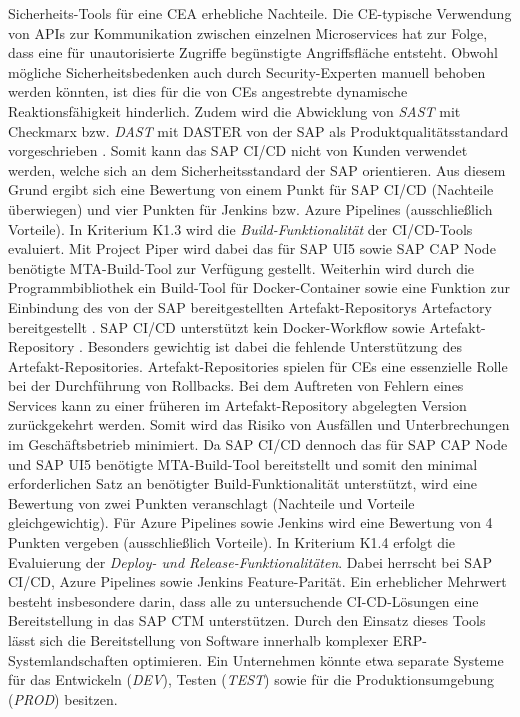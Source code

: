 Sicherheits-Tools für eine CEA erhebliche Nachteile. Die CE-typische Verwendung von APIs zur Kommunikation zwischen einzelnen Microservices hat zur Folge, dass eine für unautorisierte Zugriffe begünstigte Angriffsfläche entsteht. Obwohl mögliche Sicherheitsbedenken auch durch Security-Experten manuell behoben werden könnten, ist dies für die von CEs angestrebte dynamische Reaktionsfähigkeit hinderlich. Zudem wird die Abwicklung von \textit{\ac{SAST}} mit Checkmarx bzw. \textit{\ac{DAST}} mit DASTER von der SAP als Produktqualitätsstandard vorgeschrieben \cite[Z. 37 ff.]{ProductManagerSAPHyperspaceSecurityTools.}. Somit kann das SAP CI/CD nicht von Kunden verwendet werden, welche sich an dem Sicherheitsstandard der SAP orientieren. Aus diesem Grund ergibt sich eine Bewertung von einem Punkt für SAP CI/CD (Nachteile überwiegen) und vier Punkten für Jenkins bzw. Azure Pipelines (ausschließlich Vorteile). In Kriterium K1.3 wird die \textit{Build-Funktionalität} der CI/CD-Tools evaluiert. Mit Project Piper wird dabei das für SAP UI5 sowie SAP CAP Node benötigte MTA-Build-Tool zur Verfügung gestellt. Weiterhin wird durch die Programmbibliothek ein Build-Tool für Docker-Container sowie eine Funktion zur Einbindung des von der SAP bereitgestellten Artefakt-Repositorys Artefactory bereitgestellt \cite{.20230406}. SAP CI/CD unterstützt kein Docker-Workflow sowie Artefakt-Repository \cite{.20230406b}. Besonders gewichtig ist dabei die fehlende Unterstützung des Artefakt-Repositories. Artefakt-Repositories spielen für CEs eine essenzielle Rolle bei der Durchführung von Rollbacks. Bei dem Auftreten von Fehlern eines Services kann zu einer früheren im Artefakt-Repository abgelegten Version zurückgekehrt werden. Somit wird das Risiko von Ausfällen und Unterbrechungen im Geschäftsbetrieb minimiert. Da SAP CI/CD dennoch das für SAP CAP Node und SAP UI5 benötigte MTA-Build-Tool bereitstellt und somit den minimal erforderlichen Satz an benötigter Build-Funktionalität unterstützt, wird eine Bewertung von zwei Punkten veranschlagt (Nachteile und Vorteile gleichgewichtig). Für Azure Pipelines sowie Jenkins wird eine Bewertung von 4 Punkten vergeben (ausschließlich Vorteile). In Kriterium K1.4 erfolgt die Evaluierung der \textit{Deploy- und Release-Funktionalitäten}. Dabei herrscht bei SAP CI/CD, Azure Pipelines sowie Jenkins Feature-Parität. Ein erheblicher Mehrwert besteht insbesondere darin, dass alle zu untersuchende CI-CD-Lösungen eine Bereitstellung in das SAP CTM unterstützen.
Durch den Einsatz dieses Tools lässt sich die Bereitstellung von Software innerhalb komplexer ERP-Systemlandschaften optimieren. Ein Unternehmen könnte etwa separate Systeme für das Entwickeln (\textit{DEV}), Testen (\textit{TEST}) sowie für die Produktionsumgebung (\textit{PROD}) besitzen.

